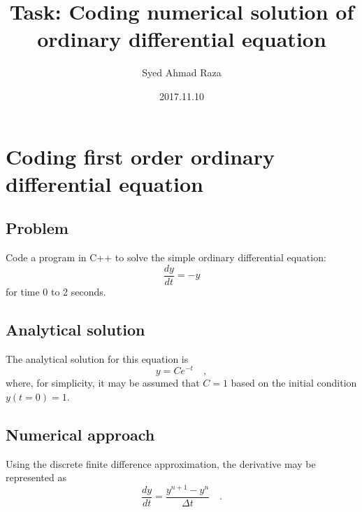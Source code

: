 \documentclass[12pt,a4paper,fleqn]{article}
\title{Task: Coding numerical solution of ordinary differential equation}
\author{Syed Ahmad Raza}
\date{2017.11.10}
\begin{document}
\section{Coding first order ordinary differential equation}

\subsection{Problem}
Code a program in C++ to solve the simple ordinary differential equation:
\begin{equation}
\frac{dy}{dt} = -y
\end{equation}
for time 0 to 2 seconds.

\subsection{Analytical solution}
The analytical solution for this equation is
\begin{equation}
y = Ce^{-t} \quad,
\end{equation}
where, for simplicity, it may be assumed that \(C=1\) based on the initial condition \(y(t=0)=1\).

\subsection{Numerical approach}
Using the discrete finite difference approximation, the derivative may be represented as
\begin{equation}
\frac{dy}{dt} = \frac{y^{n+1} - y^n}{\Delta t} \quad.
\end{equation}
\end{document}
